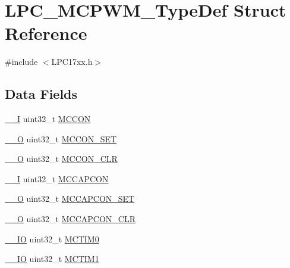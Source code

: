 \hypertarget{structLPC__MCPWM__TypeDef}{}\section{L\+P\+C\+\_\+\+M\+C\+P\+W\+M\+\_\+\+Type\+Def Struct Reference}
\label{structLPC__MCPWM__TypeDef}


{\ttfamily \#include $<$L\+P\+C17xx.\+h$>$}

\subsection*{Data Fields}
\begin{DoxyCompactItemize}
\item 
\hyperlink{LPC17xx_8h_af63697ed9952cc71e1225efe205f6cd3}{\+\_\+\+\_\+I} uint32\+\_\+t \hyperlink{structLPC__MCPWM__TypeDef_a2942d83827a853d326bed78d71585674}{M\+C\+C\+ON}
\item 
\hyperlink{LPC17xx_8h_a7e25d9380f9ef903923964322e71f2f6}{\+\_\+\+\_\+O} uint32\+\_\+t \hyperlink{structLPC__MCPWM__TypeDef_adc3ebfde76e61f94c670efb72b156237}{M\+C\+C\+O\+N\+\_\+\+S\+ET}
\item 
\hyperlink{LPC17xx_8h_a7e25d9380f9ef903923964322e71f2f6}{\+\_\+\+\_\+O} uint32\+\_\+t \hyperlink{structLPC__MCPWM__TypeDef_a2da1d71128abe6f47897e9ed263a2bde}{M\+C\+C\+O\+N\+\_\+\+C\+LR}
\item 
\hyperlink{LPC17xx_8h_af63697ed9952cc71e1225efe205f6cd3}{\+\_\+\+\_\+I} uint32\+\_\+t \hyperlink{structLPC__MCPWM__TypeDef_ae13e568ffdae5b02ef641f56ecc61174}{M\+C\+C\+A\+P\+C\+ON}
\item 
\hyperlink{LPC17xx_8h_a7e25d9380f9ef903923964322e71f2f6}{\+\_\+\+\_\+O} uint32\+\_\+t \hyperlink{structLPC__MCPWM__TypeDef_a81287b21eea8d20f6782ab846bffc322}{M\+C\+C\+A\+P\+C\+O\+N\+\_\+\+S\+ET}
\item 
\hyperlink{LPC17xx_8h_a7e25d9380f9ef903923964322e71f2f6}{\+\_\+\+\_\+O} uint32\+\_\+t \hyperlink{structLPC__MCPWM__TypeDef_a0e8e4468bf1b356f7627e068cd425c29}{M\+C\+C\+A\+P\+C\+O\+N\+\_\+\+C\+LR}
\item 
\hyperlink{LPC17xx_8h_aec43007d9998a0a0e01faede4133d6be}{\+\_\+\+\_\+\+IO} uint32\+\_\+t \hyperlink{structLPC__MCPWM__TypeDef_a52c354973cdf330d2623a2c80d967d7e}{M\+C\+T\+I\+M0}
\item 
\hyperlink{LPC17xx_8h_aec43007d9998a0a0e01faede4133d6be}{\+\_\+\+\_\+\+IO} uint32\+\_\+t \hyperlink{structLPC__MCPWM__TypeDef_a3f8405e5c04f6da3f27b0cd94570fa0d}{M\+C\+T\+I\+M1}

\end{DoxyCompactItemize}
